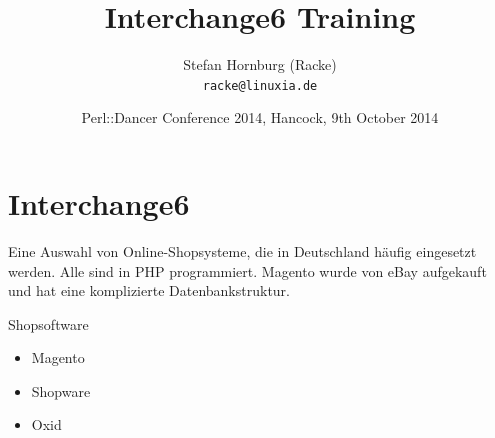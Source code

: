 \usepackage[utf8]{inputenc}
\usepackage[T1]{fontenc}
\usepackage{mathptmx}
\usepackage[scaled=.90]{helvet}
\usepackage{courier}
\usepackage{caption}
\captionsetup{labelformat=empty,labelsep=none}
\usepackage{verbatim}
\usepackage{hyperref}
\usepackage{listings}
\usepackage{ulem}
\lstset{language=Perl,basicstyle=\normalsize,tabsize=3,showstringspaces=false}


\title{Interchange6 Training}
\author[racke]{Stefan Hornburg (Racke)\\ \texttt{racke@linuxia.de}}
\date{Perl::Dancer Conference 2014, Hancock, 9th October 2014}


\maketitle{}

\begin{frame}
  \titlepage
\end{frame}


\tableofcontents

\section{Interchange6}

Eine Auswahl von Online-Shopsysteme, die in Deutschland häufig eingesetzt
werden. Alle sind in PHP programmiert. Magento wurde von eBay aufgekauft
und hat eine komplizierte Datenbankstruktur.
 
\begin{frame}{Shopsoftware}
  \begin{itemize}
  \item Magento
  \item Shopware
  \item Oxid
  \end{itemize}
\end{frame}

